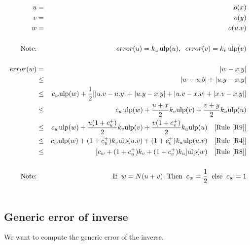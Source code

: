 \documentclass[12pt]{amsart}
\def\ulp{{\rm ulp}}
\newcommand{\U}[1]{\quad \mbox{[Rule~\ref{#1}]}}
\begin{document}
\begin{eqnarray}\nonumber
u&=&o(x) \\\nonumber
v&=&o(y) \\\nonumber
w&=&o(u.v) \\\nonumber
&&\\\nonumber
\textnormal{Note:}&& error(u) = k_u \, \ulp(u), \;\; error(v) = k_v \, \ulp(v)\\\nonumber
&&\\\nonumber
error(w)& = &|w - x.y| \\\nonumber
& \leq &|w - u.b| +|u.y - x.y| \\\nonumber
& \leq & c_w \ulp(w) +  \frac{1}{2} [|u.v-u.y|+|u.y-x.y|+|u.v-x.v|+|x.v-x.y|]\\\nonumber
& \leq & c_w \ulp(w) +  \frac{u+x}{2} k_v \ulp(v) + \frac{v+y}{2} k_u \ulp(u)\\\nonumber
& \leq & c_w \ulp(w) +  \frac{u(1+c_u^+)}{2} k_v \ulp(v) + \frac{v(1+c_v^+)}{2} k_u \ulp(u) \U{R9}\\\nonumber
& \leq & c_w \ulp(w) +  (1+c_u^+) k_v \ulp(u.v) + (1+c_v^+) k_u \ulp(u.v) \U{R4}\\\nonumber
& \leq & [ c_w +  (1+c_u^+) k_v + (1+c_v^+) k_u ] \ulp(w)\U{R8}\\\nonumber
&&\\\nonumber
\textnormal{Note:}&&\textnormal{If}\;\; w=N(u+v) \;\;\textnormal{Then}\;\; c_w =\frac{1}{2} \;\;\textnormal{else}\;\; c_w =1\\\nonumber
\end{eqnarray}




\subsection{Generic error of inverse}\label{generic:inv}




We want to compute the generic error of the inverse.
\end{document}
